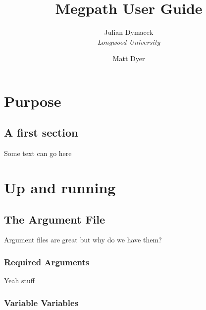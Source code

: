 \documentclass[10pt]{report}
\title{Megpath User Guide}
\author{
  Julian Dymacek\\
  \textit{Longwood University}
  \and
  Matt Dyer\\
}
\begin{document}
\maketitle
\tableofcontents


\chapter{Purpose}
\section{A first section}
Some text can go here
\chapter{Up and running}
\section{The Argument File}
Argument files are great but why do we have them?
\subsection{Required Arguments}
Yeah stuff
\subsection{Variable Variables}
\end{document}

